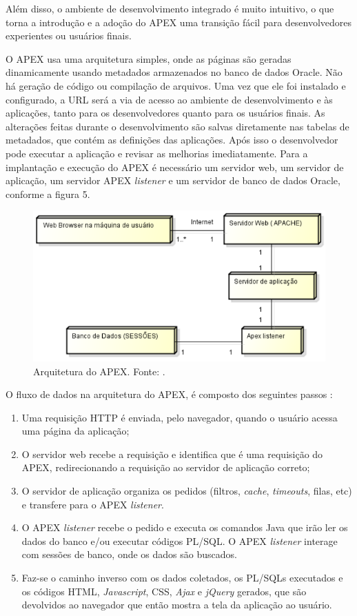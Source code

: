 Além disso, o ambiente de desenvolvimento integrado é muito intuitivo, o que torna a introdução e a adoção do APEX uma transição fácil para desenvolvedores experientes ou usuários finais.

O APEX usa uma arquitetura simples, onde as páginas são geradas dinamicamente usando metadados armazenados no banco de dados Oracle. Não há geração de código ou compilação de arquivos. Uma vez que ele foi instalado e configurado, a URL será a via de acesso ao ambiente de desenvolvimento e às aplicações, tanto para os desenvolvedores quanto para os usuários finais. As alterações feitas durante o desenvolvimento são salvas diretamente nas tabelas de metadados, que contém as definições das aplicações. Após isso o desenvolvedor pode executar a aplicação e revisar as melhorias imediatamente.
Para a implantação e execução do APEX é necessário um servidor web, um servidor de aplicação, um servidor APEX \textit{listener} e um servidor de banco de dados Oracle, conforme a figura 5.
\clearpage

\begin{figure}[!htb]
	\centering
		\includegraphics[scale=0.6]{figuras/arquitetura_apex}
	\caption{Arquitetura do APEX. Fonte: \cite{ferreira2015}.}
\end{figure}

O fluxo de dados na arquitetura do APEX, é composto dos seguintes passos \cite{ferreira2015}:
\begin{enumerate}
\item Uma requisição HTTP é enviada, pelo navegador, quando o usuário acessa uma página da aplicação;
\item O servidor web recebe a requisição e identifica que é uma requisição do APEX, redirecionando a requisição ao servidor de aplicação correto;
\item O servidor de aplicação organiza os pedidos (filtros, \textit{cache}, \textit{timeouts}, filas, etc) e transfere para o APEX \textit{listener}.
\item O APEX \textit{listener} recebe o pedido e executa os comandos Java que irão ler os dados do banco e/ou executar códigos PL/SQL. O APEX \textit{listener} interage com sessões de banco, onde os dados são buscados.
\item Faz-se o caminho inverso com os dados coletados, os PL/SQLs executados e os códigos HTML, \textit{Javascript}, CSS, \textit{Ajax} e \textit{jQuery} gerados, que são devolvidos ao navegador que então mostra a tela da aplicação ao usuário.
\end{enumerate}

